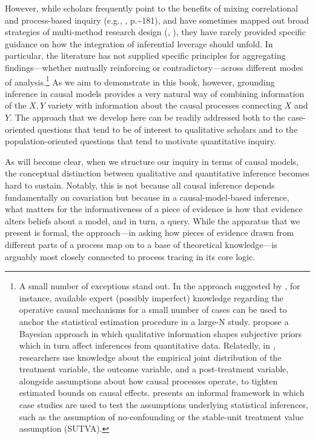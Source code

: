 \documentclass[
  12pt,
]{book}
\begin{document}
However, while scholars frequently point to the benefits of mixing correlational and process-based inquiry (e.g., \citet{collier2010sources}, p.\textasciitilde181), and have sometimes mapped out broad strategies of multi-method research design (\citet{Lieberman2005nested}, \citet{SeawrightGerring2008}), they have rarely provided specific guidance on how the integration of inferential leverage should unfold. In particular, the literature has not supplied specific principles for aggregating findings---whether mutually reinforcing or contradictory---across different modes of analysis.\footnote{A small number of exceptions stand out. In the approach suggested by \citet{gordon2004quantitative}, for instance, available expert (possibly imperfect) knowledge regarding the operative causal mechanisms for a small number of cases can be used to anchor the statistical estimation procedure in a large-N study. \citet{WesternJackman1994} propose a Bayesian approach in which qualitative information shapes subjective priors which in turn affect inferences from quantitative data. Relatedly, in \citet{GlynnQuinn2011}, researchers use knowledge about the empirical joint distribution of the treatment variable, the outcome variable, and a post-treatment variable, alongside assumptions about how causal processes operate, to tighten estimated bounds on causal effects. \citet{seawrightbook} presents an informal framework in which case studies are used to test the assumptions underlying statistical inferences, such as the assumption of no-confounding or the stable-unit treatment value assumption (SUTVA).}
As we aim to demonstrate in this book, however, grounding inference in causal models provides a very natural way of combining information of the \(X,Y\) variety with information about the causal processes connecting \(X\) and \(Y\). The approach that we develop here can be readily addressed both to the case-oriented questions that tend to be of interest to qualitative scholars and to the population-oriented questions that tend to motivate quantitative inquiry.

As will become clear, when we structure our inquiry in terms of causal models, the conceptual distinction between qualitative and quantitative inference becomes hard to sustain. Notably, this is not because all causal inference depends fundamentally on covariation but because in a causal-model-based inference, what matters for the informativeness of a piece of evidence is how that evidence alters beliefs about a model, and in turn, a query. While the apparatus that we present is formal, the approach---in asking how pieces of evidence drawn from different parts of a process map on to a base of theoretical knowledge---is arguably most closely connected to process tracing in its core logic.
\end{document}
